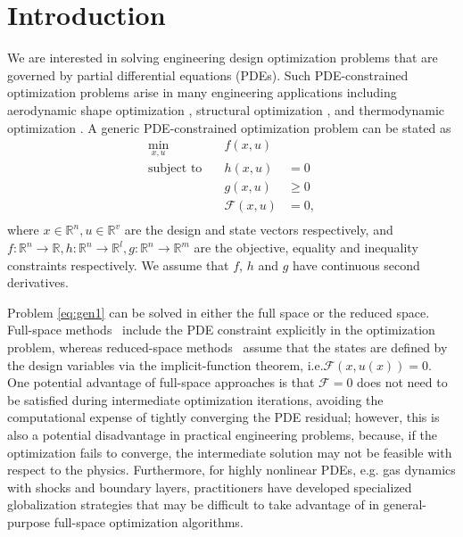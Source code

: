 \documentclass{article}
\makeatletter
\newcommand{\eg}[0]{{e.g.\@}\xspace}
\newcommand{\ie}[0]{{i.e.\@}\xspace}
\theoremstyle{definition}
\makeatother
\begin{document}
\section{Introduction}
We are interested in solving engineering design optimization problems that are governed by partial differential equations (PDEs). Such PDE-constrained optimization problems arise in many engineering applications including aerodynamic shape optimization \cite{lambe:2014,lyu2014aerodynamic, Zhang567303}, structural optimization \cite{DBLP:DeckelnickHJ17, lambe:2014, kennedy14}, and thermodynamic optimization \cite{chen1999finite,bejan2000thermodynamic,bejan2012thermodynamic}. A generic PDE-constrained optimization problem can be stated as
\begin{equation}\label{eq:gen1}
\begin{aligned}
\underset{x,u}{\text{min}} \quad &f(x, u) &\\
\text{subject to} \quad &  h(x,u) &= 0  \\
 &  g(x,u) &\geq 0  \\
\quad &  \mathcal{F}(x, u) &= 0, \\
\end{aligned}
\end{equation}
where $x \in \mathbb{R}^n, u \in \mathbb{R}^v$ are the design and state vectors respectively, and $f: \mathbb{R}^n \rightarrow \mathbb{R}, h: \mathbb{R}^n \rightarrow \mathbb{R}^l, g:\mathbb{R}^n \rightarrow \mathbb{R}^m$ are the objective, equality and inequality constraints respectively. We assume that $f$, $h$ and $g$ have continuous second derivatives. 

Problem \eqref{eq:gen1} can be solved in either the full space or the reduced space.  Full-space methods~\cite{DBLP:journals/siamsc/BirosG05,DBLP:journals/siamsc/BirosG05a,haber:2001} include the PDE constraint explicitly in the optimization problem, whereas reduced-space methods~\cite{akcelik:2006} assume that the states are defined by the design variables via the implicit-function theorem, \ie $\mathcal{F}(x,u(x)) = 0$.  One potential advantage of full-space approaches is that $\mathcal{F} =0$ does not need to be satisfied during intermediate optimization iterations, avoiding the computational expense of tightly converging the PDE residual; however, this is also a potential disadvantage in practical engineering problems, because, if the optimization fails to converge, the intermediate solution may not be feasible with respect to the physics.  Furthermore, for highly nonlinear PDEs, \eg gas dynamics with shocks and boundary layers, practitioners have developed specialized globalization strategies that may be difficult to take advantage of in general-purpose full-space optimization algorithms.
\end{document}
